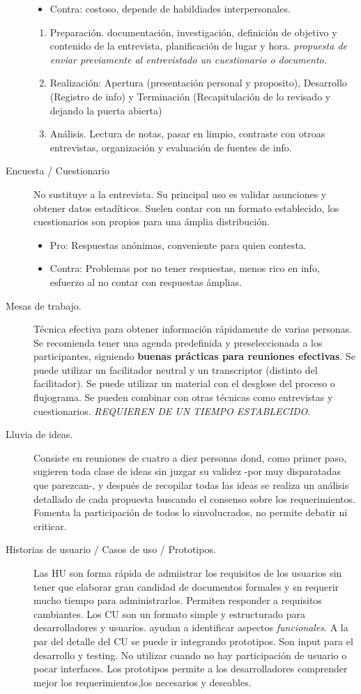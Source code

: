 \documentclass[12pt]{article} %
\begin{document}
\begin{description}
\begin{itemize}
\item Contra: costoso, depende de habildiades interpersonales.
\end{itemize}
\begin{enumerate}
\item Preparación. documentación, investigación, definición de objetivo y contenido de la entrevista, planificación de lugar y hora. \emph{propuesta de enviar previamente al entrevistado un cuestionario o documento}.
\item Realización: Apertura (presentación personal y proposito), Desarrollo (Registro de info) y Terminación (Recapitulación de lo revisado y dejando la puerta abierta)
\item Análisis. Lectura de notas, pasar en limpio, contraste con otroas entrevistas, organización y evaluación de fuentes de info.
\end{enumerate}
\item[Encuesta / Cuestionario] No sustituye a la entrevista. Su principal uso es validar asunciones y obtener datos estadíticos. Suelen contar con un formato establecido, los cuestionarios son propios para una ámplia distribución.
\begin{itemize}
\item Pro: Respuestas anónimas, conveniente para quien contesta.
\item Contra: Problemas por no tener respuestas, menos rico en info, esfuerzo al no contar con respuestas ámplias.
\end{itemize}
\item[Mesas de trabajo.] Técnica efectiva para obtener información rápidamente de varias personas. Se recomienda tener una agenda predefinida y preseleccionada a los participantes, siguiendo \textbf{buenas prácticas para reuniones efectivas}. Se puede utilizar un facilitador neutral y un transcriptor (distinto del facilitador). Se puede utilizar un material con el desglose del proceso o flujograma. Se pueden combinar  con otras técnicas como entrevistas y cuestionarios. \emph{REQUIEREN DE UN TIEMPO ESTABLECIDO}.
\item[Lluvia de ideas.] Consiste en reuniones de cuatro a diez personas dond, como primer paso, sugieren toda clase de ideas sin juzgar su validez -por muy disparatadas que parezcan-, y después de recopilar todas las ideas se realiza un análisis detallado de cada propuesta buscando el consenso sobre los requerimientos. Fomenta la participación de todos lo sinvolucrados, no permite debatir ni criticar.
\item[Historias de usuario / Casos de uso / Prototipos.] Las HU son forma rápida de admiistrar los requisitos de los usuarios sin tener que elaborar gran candidad de documentos formales y sn requerir mucho tiempo para administrarlos. Permiten responder a requisitos cambiantes. Los CU son un formato simple y estructurado para desarrolladores y usuarios. ayudan a identificar aspectos \emph{funcionales}. A la par del detalle del CU se puede ir integrando prototipos. Son input para el desarrollo y testing. No utilizar cuando no hay participación de usuario o pocar interfaces. Los prototipos permite a los desarrolladores comprender mejor los requerimientos,los necesarios  y deseables.
\end{description}
\end{document}
